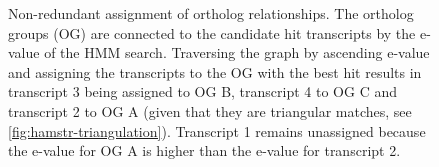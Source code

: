 \begin{figure}[h]
	\centering
	\def\svgwidth{0.8\textwidth}
	
	\caption[Non-redundant assignment of ortholog relationships]{
		Non-redundant assignment of ortholog relationships. The ortholog groups (OG)
		are connected to the candidate hit transcripts by the e-value of the HMM
		search. Traversing the graph by ascending e-value and assigning the
		transcripts to the OG with the best hit results in transcript 3 being
		assigned to OG B, transcript 4 to OG C and transcript 2 to OG A (given that
		they are triangular matches, see \autoref{fig:hamstr-triangulation}).
		Transcript 1 remains unassigned because the  e-value for OG
		A is higher than the e-value for transcript 2.
	}
	\label{fig:orthograph-graph}
\end{figure}

